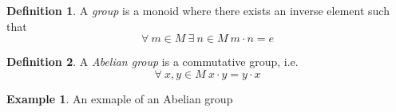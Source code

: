 \documentclass{article}
\theoremstyle{definition}
\newtheorem{definition}{Definition}[section]
\newtheorem{example}{Example}[section]
\begin{document}
\begin{definition}
	A \textit{group} is a monoid where there exists an inverse element such that
	$$\forall\ m \in M\ \exists\ n \in M\ m \cdot n = e$$
\end{definition}

\begin{definition}
	A \textit{Abelian group} is a commutative group, i.e.
	$$\forall\ x, y \in M\ x \cdot y = y \cdot x$$
\end{definition}

\begin{example}
	An exmaple of an Abelian group
\end{example}
\end{document}
